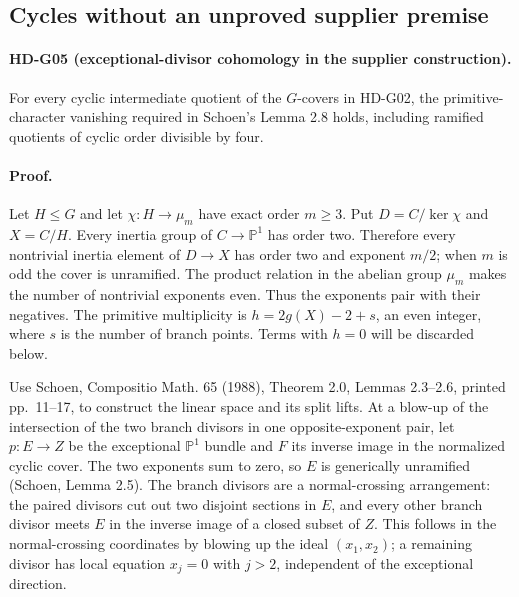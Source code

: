 \subsection{Cycles without an unproved supplier premise}

\paragraph{HD-G05 (exceptional-divisor cohomology in the supplier construction).}
For every cyclic intermediate quotient of the $G$-covers in HD-G02,
the primitive-character vanishing required in Schoen's Lemma 2.8 holds,
including ramified quotients of cyclic order divisible by four.

\paragraph{Proof.}
Let $H\le G$ and let $\chi:H\to\mu_m$ have exact order $m\ge3$.
Put $D=C/\ker\chi$ and $X=C/H$. Every inertia group of $C\to\mathbb P^1$
has order two. Therefore every nontrivial inertia element of $D\to X$
has order two and exponent $m/2$; when $m$ is odd the cover is unramified.
The product relation in the abelian group $\mu_m$ makes the number
of nontrivial exponents even. Thus the exponents pair with their negatives.
The primitive multiplicity is $h=2g(X)-2+s$, an even integer, where $s$
is the number of branch points. Terms with $h=0$ will be discarded below.

Use Schoen, Compositio Math. 65 (1988), Theorem 2.0, Lemmas 2.3--2.6,
printed pp.~11--17, to construct the linear space and its split lifts.
At a blow-up of the intersection of the two branch divisors in one
opposite-exponent pair, let $p:E\to Z$ be the exceptional $\mathbb P^1$
bundle and $F$ its inverse image in the normalized cyclic cover.
The two exponents sum to zero, so $E$ is generically unramified
(Schoen, Lemma 2.5). The branch divisors are a normal-crossing arrangement:
the paired divisors cut out two disjoint sections in $E$, and every
other branch divisor meets $E$ in the inverse image of a closed subset
of $Z$. This follows in the normal-crossing coordinates by blowing up
the ideal $(x_1,x_2)$; a remaining divisor has local equation $x_j=0$
with $j>2$, independent of the exceptional direction.

